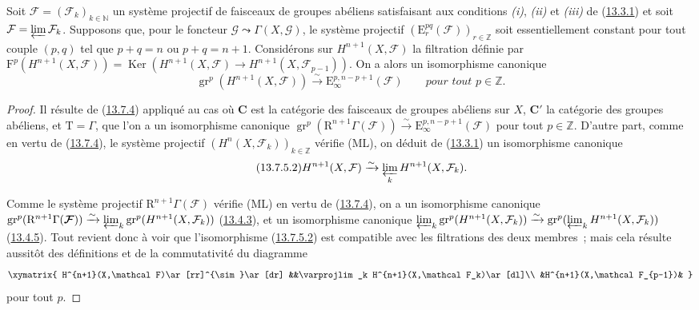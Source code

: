 \begin{corollary}[13.7.5]
\label{0.13.7.5-fr}
Soit $\boldsymbol{\mathcal F}=(\mathcal F_k)_{k\in\mathbb N}$ un système
projectif de faisceaux de groupes abéliens satisfaisant aux conditions
\emph{(i)}, \emph{(ii)} et \emph{(iii)} de
\textup{(\hyperref[0.13.3.1-fr]{13.3.1})} et soit
$\mathcal F=\varprojlim\mathcal F_k$. Supposons que, pour le foncteur
$\mathcal G\leadsto\Gamma(X,\mathcal G)$, le système projectif
$(\mathrm E_r^{pq}(\boldsymbol{\mathcal F}))_{r\in\mathbb Z}$ soit essentiellement
constant pour tout couple $(p,q)$ tel que $p+q=n$ ou $p+q=n+1$.
Considérons sur $H^{n+1}(X,\mathcal F)$ la filtration définie par
$\mathrm F^p(H^{n+1}(X,\mathcal F))=
\operatorname{Ker}(H^{n+1}(X,\mathcal F)\to
H^{n+1}(X,\mathcal F_{p-1}))$. On a alors un isomorphisme canonique
\begin{equation}
\label{0.13.7.5.1-fr}
\tag{13.7.5.1}
\operatorname{gr}^p(H^{n+1}(X,\mathcal F))
\xrightarrow{\sim}\mathrm E_\infty^{p,n-p+1}(\boldsymbol{\mathcal F})
\qquad\textit{pour tout $p\in\mathbb Z$.}
\end{equation}
\end{corollary}
\begin{proof}
Il résulte de (\hyperref[0.13.7.4-fr]{13.7.4}) appliqué au cas où $\boldsymbol{C}$
est la catégorie des faisceaux de groupes abéliens sur $X$, $\boldsymbol{C}'$ la
catégorie des groupes abéliens, et $\mathrm T=\Gamma$, que l'on a un
isomorphisme
canonique
$\operatorname{gr}^p(\mathrm R^{n+1}\Gamma(\boldsymbol{\mathcal F}))
\xrightarrow{\sim}\mathrm E_\infty^{p,n-p+1}(\boldsymbol{\mathcal F})$ pour tout
$p\in\mathbb Z$. D'autre part, comme en vertu de
(\hyperref[0.13.7.4-fr]{13.7.4}), le système projectif
$(H^n(X,\mathcal F_k))_{k\in\mathbb Z}$ vérifie (ML), on déduit de
(\hyperref[0.13.3.1-fr]{13.3.1}) un isomorphisme canonique
\hypertarget{canon-legacy.0-III.13.7.5.proof-comparison}{}
\[
\label{0.13.7.5.1b-fr}
\tag{13.7.5.2}
H^{n+1}(X,\mathcal F)\xrightarrow{\sim}
\varprojlim_k H^{n+1}(X,\mathcal F_k).
\]

Comme le système projectif $\mathrm R^{n+1}\Gamma(\boldsymbol{\mathcal F})$ vérifie
(ML) en vertu de (\hyperref[0.13.7.4-fr]{13.7.4}), on a un isomorphisme
canonique
$\operatorname{gr}^p(\mathrm R^{n+1}\Gamma(\boldsymbol{\mathcal F}))
\xrightarrow{\sim}
\varprojlim_k\operatorname{gr}^p(H^{n+1}(X,\mathcal F_k))$
(\hyperref[0.13.4.3-fr]{13.4.3}), et un isomorphisme canonique
$\varprojlim_k\operatorname{gr}^p(H^{n+1}(X,\mathcal F_k))
\xrightarrow{\sim}
\operatorname{gr}^p(\varprojlim_k H^{n+1}(X,\mathcal F_k))$
(\hyperref[0.13.4.5-fr]{13.4.5}). Tout revient donc à voir que
l'isomorphisme (\hyperref[0.13.7.5.1b-fr]{13.7.5.2}) est compatible avec
les filtrations des deux membres~; mais cela résulte aussitôt des
définitions et de la commutativité du diagramme
\[
\xymatrix{
H^{n+1}(X,\mathcal F)\ar[rr]^{\sim}\ar[dr]
&&\varprojlim_k H^{n+1}(X,\mathcal F_k)\ar[dl]\\
&H^{n+1}(X,\mathcal F_{p-1})&
}
\]
pour tout $p$.
\end{proof}

